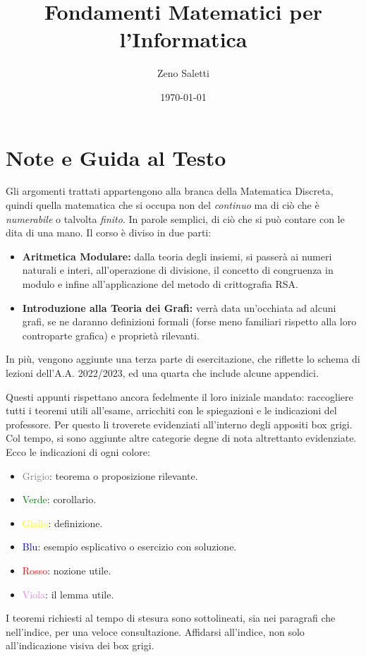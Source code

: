 \documentclass[oneside]{book}
\title{Fondamenti Matematici per l'Informatica}
\author{Zeno Saletti}
\date{\today}
\begin{document}
\begin{titlepage}
\maketitle
\end{titlepage}


\chapter*{Note e Guida al Testo}
Gli argomenti trattati appartengono alla branca della Matematica Discreta,
quindi quella matematica che si occupa non del \textit{continuo} ma di
ciò che è \textit{numerabile} o talvolta \textit{finito}. In parole
semplici, di ciò che si può contare con le dita di una mano. Il corso
è diviso in due parti:
\begin{itemize}
\item \textbf{Aritmetica Modulare:} dalla teoria degli insiemi,
si passerà ai numeri naturali e interi, all'operazione di divisione,
il concetto di congruenza in modulo e infine all'applicazione
del metodo di crittografia RSA.

\item \textbf{Introduzione alla Teoria dei Grafi:} verrà data un'occhiata
ad alcuni grafi, se ne daranno definizioni formali (forse meno familiari
rispetto alla loro controparte grafica) e proprietà rilevanti.
\end{itemize}
In più, vengono aggiunte una terza parte di esercitazione, che riflette
lo schema di lezioni dell'A.A. 2022/2023, ed una quarta che include
alcune appendici.

Questi appunti rispettano ancora fedelmente il loro iniziale mandato:
raccogliere tutti i teoremi utili all'esame, arricchiti con le spiegazioni
e le indicazioni del professore. Per questo li troverete evidenziati
all'interno degli appositi box grigi. Col tempo, si sono aggiunte altre
categorie degne di nota altrettanto evidenziate. Ecco le indicazioni di ogni
colore:
\begin{itemize}
\item \textcolor{gray}{Grigio}: teorema o proposizione rilevante.
\item \textcolor{green}{Verde}: corollario.
\item \textcolor{yellow}{Giallo}: definizione.
\item \textcolor{blue}{Blu}: esempio esplicativo o esercizio con soluzione.
\item \textcolor{red}{Rosso}: nozione utile.
\item \textcolor{violet}{Viola}: il lemma utile.
\end{itemize}
I teoremi richiesti al tempo di stesura sono sottolineati, sia
nei paragrafi che nell'indice, per una veloce consultazione.
Affidarsi all'indice, non solo all'indicazione visiva dei box
grigi.
\end{document}
